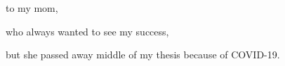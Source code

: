 \begin{dedication}
to my mom,

who always wanted to see my success,

but she passed away middle of my thesis because of COVID-19.
\end{dedication}